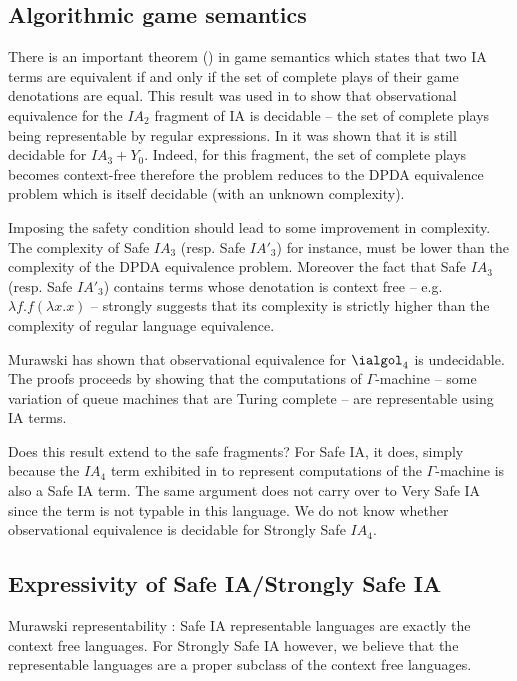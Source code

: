\subsection{Algorithmic game semantics}

There is an important theorem (\cite{AM97a}) in game semantics
which states that two IA terms are equivalent if and only if the set
of complete plays of their game denotations are equal. This result was used in \cite{ghicamccusker00} to show that observational
equivalence for the $IA_2$ fragment of IA is decidable -- the set of
complete plays being representable by regular expressions. In
\cite{Ong02} it was shown that it is still decidable
 for $IA_3+Y_0$. Indeed, for this fragment, the set of complete plays becomes context-free
therefore the problem reduces to the DPDA equivalence problem which
is itself decidable (with an unknown complexity).

Imposing the safety condition should lead to some improvement in
complexity. The complexity of  Safe $IA_3$ (resp. Safe $IA'_3$) for
instance, must be lower than the complexity of the DPDA equivalence
problem. Moreover the fact that Safe $IA_3$ (resp. Safe $IA'_3$)
contains terms whose denotation is context free -- e.g. $\lambda f .
f (\lambda x .x )$ -- strongly suggests that its complexity is
strictly higher than the complexity of regular language equivalence.

Murawski \cite{Murawski2003} has shown that observational
equivalence for $\ialgol_4$ is undecidable. The proofs proceeds by
showing that the computations of $\Gamma$-machine -- some variation
of queue machines that are Turing complete -- are representable
using IA terms.

Does this result extend to the safe fragments? For Safe IA, it does,
simply because the $IA_4$ term exhibited in \cite{Murawski2003} to
represent computations of the $\Gamma$-machine is also a Safe IA
term. The same argument does not carry over to Very Safe IA since
the term is not typable in this language. We do not know whether
observational equivalence is decidable for Strongly Safe $IA_4$.



\subsection{Expressivity of Safe IA/Strongly Safe IA}

Murawski representability : Safe IA representable languages are
exactly the context free languages. For Strongly Safe IA however, we
believe that the representable languages are a proper subclass of
the context free languages.













